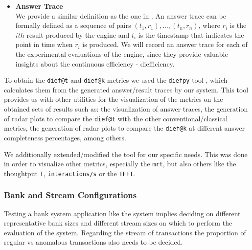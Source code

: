 \begin{itemize}
    \item \textbf{Answer Trace\\}
    We provide a similar definition as the one in \cite{exps-diefficiency}. An answer trace can be formally defined as a sequence of pairs $(t_1,r_1),...,(t_n,r_n)$, where $r_i$ is the $ith$ result produced by the engine and $t_i$ is the timestamp that indicates the point in time when $r_i$ is produced. We will record an answer trace for each of the experimental evaluations of the engine, since they provide valuable insights about the continuous efficiency - diefficiency.

\end{itemize}

To obtain the \texttt{dief@t} and \texttt{dief@k} metrics we used the \texttt{diefpy} tool \cite{exps-diefpy-tool}, which calculates them from the generated answer/result traces by our system. This tool provides us with other utilities for the visualization of the metrics on the obtained sets of results such as: the visualization of answer traces, the generation of radar plots to compare the \texttt{dief@t} with the other conventional/classical metrics, the generation of radar plots to compare the \texttt{dief@k} at different answer completeness percentages, among others.

We additionally extended/modified the tool for our specific needs. This was done in order to visualize other metrics, especially the \texttt{mrt}, but also others like the thoughtput \texttt{T}, \texttt{interactions/s} or the \texttt{TFFT}.


\subsubsection{Bank and Stream Configurations}\label{exps:bank-stream-configs}

Testing a bank system application like the \DPATM system implies deciding on different representative bank sizes and different stream sizes on which to perform the evaluation of the system. Regarding the stream of transactions the proportion of regular vs anomalous transactions also needs to be decided.\\

